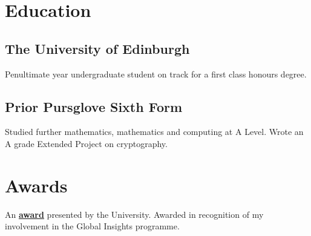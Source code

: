 \documentclass[]{deedy-resume-openfont}
\begin{document}
%
%

%
%

\begin{minipage}[t]{0.33\textwidth} 


\section{Education} 

\subsection{The University \newline of Edinburgh}
Penultimate year undergraduate student on track for a first class honours degree. \\
\sectionsep

\subsection{Prior Pursglove \newline Sixth Form}
Studied further mathematics, mathematics and computing at A Level. Wrote an A grade Extended Project on cryptography. \\
\sectionsep


\section{Awards}
An \href{https://www.ed.ac.uk/edinburgh-award}{\bf award} presented by the University. Awarded in recognition of my involvement in the Global Insights programme.
\sectionsep


\end{minipage}
\end{document}
